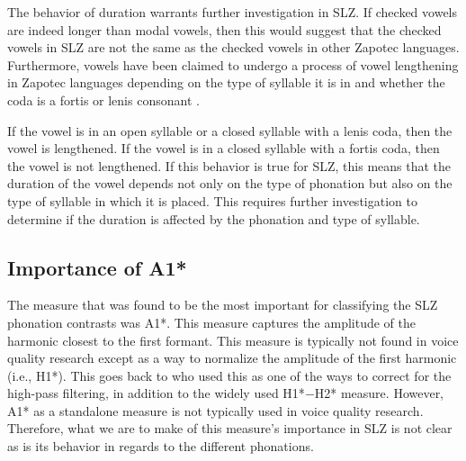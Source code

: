 The behavior of duration warrants further investigation in SLZ. If checked vowels are indeed longer than modal vowels, then this would suggest that the checked vowels in SLZ are not the same as the checked vowels in other Zapotec languages. Furthermore, vowels have been claimed to undergo a process of vowel lengthening in Zapotec languages depending on the type of syllable it is in and whether the coda is a fortis or lenis consonant \citep{nellisFortisLenisCajonos1980,uchiharaFortisLenisGlides2016}. 

If the vowel is in an open syllable or a closed syllable with a lenis coda, then the vowel is lengthened. If the vowel is in a closed syllable with a fortis coda, then the vowel is not lengthened. If this behavior is true for SLZ, this means that the duration of the vowel depends not only on the type of phonation but also on the type of syllable in which it is placed. This requires further investigation to determine if the duration is affected by the phonation and type of syllable.
\subsection{Importance of A1*} \label{sec:a1_discussion}

The measure that was found to be the most important for classifying the SLZ phonation contrasts was A1*. This measure captures the amplitude of the harmonic closest to the first formant. This measure is typically not found in voice quality research except as a way to normalize the amplitude of the first harmonic (i.e., H1*). This goes back to \citet{fischer-jorgensenPhoneticAnalysisBreathy1968} who used this as one of the ways to correct for the high-pass filtering, in addition to the widely used H1*$-$H2* measure. However, A1* as a standalone measure is not typically used in voice quality research. Therefore, what we are to make of this measure's importance in SLZ is not clear as is its behavior in regards to the different phonations. 

